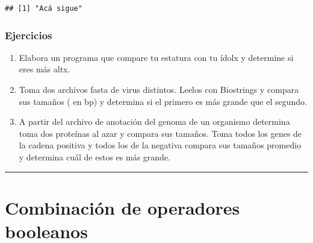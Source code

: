 \documentclass[
]{book}
\newenvironment{Shaded}{\begin{snugshade}}{\end{snugshade}}
\newcommand{\ControlFlowTok}[1]{\textcolor[rgb]{0.13,0.29,0.53}{\textbf{#1}}}
\newcommand{\DecValTok}[1]{\textcolor[rgb]{0.00,0.00,0.81}{#1}}
\newcommand{\FunctionTok}[1]{\textcolor[rgb]{0.13,0.29,0.53}{\textbf{#1}}}
\newcommand{\NormalTok}[1]{#1}
\newcommand{\OtherTok}[1]{\textcolor[rgb]{0.56,0.35,0.01}{#1}}
\newcommand{\SpecialCharTok}[1]{\textcolor[rgb]{0.81,0.36,0.00}{\textbf{#1}}}
\newcommand{\StringTok}[1]{\textcolor[rgb]{0.31,0.60,0.02}{#1}}
\providecommand{\tightlist}{%
  \setlength{\itemsep}{0pt}\setlength{\parskip}{0pt}}
\begin{document}
\begin{Shaded}
\end{Shaded}

\begin{verbatim}
## [1] "Acá sigue"
\end{verbatim}

\subsubsection{Ejercicios}\label{ejercicios-3}

\begin{enumerate}
\def\labelenumi{\arabic{enumi}.}
\tightlist
\item
  Elabora un programa que compare tu estatura con tu ídolx y determine si eres más altx.
\item
  Toma dos archivos fasta de virus distintos. Leelos con Biostrings y compara sus tamaños ( en bp) y determina si el primero es más grande que el segundo.
\item
  A partir del archivo de anotación del genoma de un organismo determina toma dos proteínas al azar y compara sus tamaños. Toma todos los genes de la cadena positiva y todos los de la negativa compara sus tamaños promedio y determina cuál de estos es más grande.
\end{enumerate}

\begin{center}\rule{0.5\linewidth}{0.5pt}\end{center}

\section{Combinación de operadores booleanos}\label{combinaciuxf3n-de-operadores-booleanos}
\end{document}

